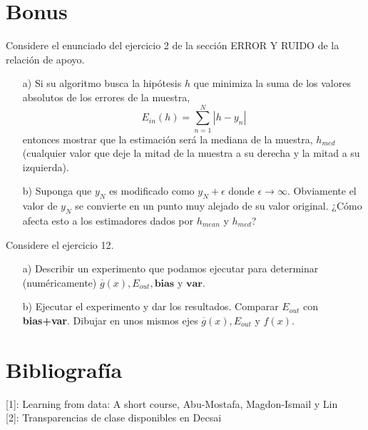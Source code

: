 \documentclass[12pt]{article}
\theoremstyle{definition}
\begin{document}
\section{Bonus}
\begin{pregunta}
Considere el enunciado del ejercicio 2 de la sección ERROR Y RUIDO de la relación de apoyo.
\begin{enumerate}
\item[a)] Si su algoritmo busca la hipótesis $h$ que minimiza la suma de los valores absolutos de los errores de la muestra,
\begin{equation}
E_{in}(h) = \sum_{n=1}^{N}|h-y_n|
\end{equation}
entonces mostrar que la estimación será la mediana de la muestra, $h_{med}$ (cualquier valor que deje la mitad de la muestra a su derecha y la mitad a su izquierda).
\item[b)] Suponga que $y_N$ es modificado como $y_N+\epsilon$ donde $\epsilon \rightarrow \infty$. Obviamente el valor de $y_N$ se convierte en un punto muy alejado de su valor original. ¿Cómo afecta esto a los estimadores dados por $h_{mean}$ y $h_{med}$?
\end{enumerate}
\end{pregunta}

\begin{pregunta}
Considere el ejercicio 12.
\begin{enumerate}
\item[a)] Describir un experimento que podamos ejecutar para determinar (numéricamente) $\overline{g}(x), E_{out}, \textbf{bias}$ y $\textbf{var}.$
\item[b)] Ejecutar el experimento y dar los resultados. Comparar $E_{out}$ con \textbf{bias+var}. Dibujar en unos mismos ejes $\overline{g}(x), E_{out}$ y $f(x)$.
\end{enumerate}
\end{pregunta}

\section{Bibliografía}
[1]: Learning from data: A short course, Abu-Mostafa, Magdon-Ismail y Lin\\

[2]: Transparencias de clase disponibles en Decsai
\end{document}
